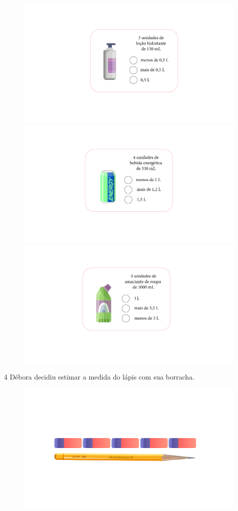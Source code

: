 {\begin{figure}[htpb!]
\includegraphics[width=.3\textwidth]{../ilustracoes/MAT5/SAEB_5ANO_MAT_figura31b.png}
\includegraphics[width=.3\textwidth]{../ilustracoes/MAT5/SAEB_5ANO_MAT_figura31c.png}
\includegraphics[width=.3\textwidth]{../ilustracoes/MAT5/SAEB_5ANO_MAT_figura31d.png}
\end{figure}



\num{4} Débora decidiu estimar a medida do lápis com sua borracha.

\begin{figure}[htpb!]
\includegraphics[width=\textwidth]{../ilustracoes/MAT5/SAEB_5ANO_MAT_figura32.png}
\end{figure}

}

